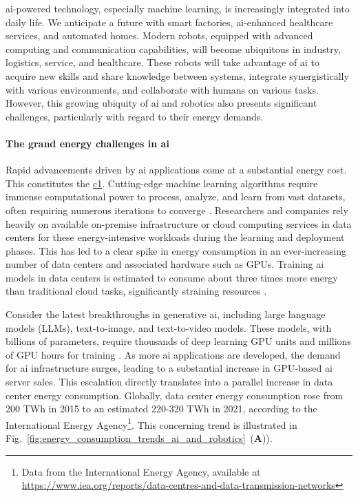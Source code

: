 \documentclass[12pt]{article}
\begin{document}
\Ac{ai}-powered technology, especially machine learning, is increasingly integrated into daily life. We anticipate a future with smart factories, \ac{ai}-enhanced healthcare services, and automated homes. Modern robots, equipped with advanced computing and communication capabilities, will become ubiquitous in industry, logistics, service, and healthcare. These robots will take advantage of \ac{ai} to acquire new skills and share knowledge between systems, integrate synergistically with various environments, and collaborate with humans on various tasks. However, this growing ubiquity of \ac{ai} and robotics also presents significant challenges, particularly with regard to their energy demands.

\paragraph*{The grand energy challenges in \ac{ai}}
Rapid advancements driven by \ac{ai} applications come at a substantial energy cost. This constitutes the \underline{\ac{c1}}. Cutting-edge machine learning algorithms require immense computational power to process, analyze, and learn from vast datasets, often requiring numerous iterations to converge \cite{Strubell2019EnergyPolicyConsiderations}. Researchers and companies rely heavily on available on-premise infrastructure or cloud computing services in data centers for these energy-intensive workloads during the learning and deployment phases. This has led to a clear spike in energy consumption in an ever-increasing number of data centers and associated hardware such as GPUs. Training \ac{ai} models in data centers is estimated to consume about three times more energy than traditional cloud tasks, significantly straining resources \cite{Thomas2023cloudusesmassive}.

Consider the latest breakthroughs in generative \ac{ai}, including large language models (LLMs), text-to-image, and text-to-video models. These models, with billions of parameters, require thousands of deep learning GPU units and millions of GPU hours for training \cite{Vanian2023ChatGPTgenerativeAI, Corbyn2023Nvidiachipmaker}. As more \ac{ai} applications are developed, the demand for \ac{ai} infrastructure surges, leading to a substantial increase in GPU-based \ac{ai} server sales. This escalation directly translates into a parallel increase in data center energy consumption. Globally, data center energy consumption rose from 200 TWh in 2015 to an estimated 220-320 TWh in 2021, according to the International Energy Agency\footnote{Data from the International Energy Agency, available at \url{https://www.iea.org/reports/data-centres-and-data-transmission-networks}}. This concerning trend is illustrated in Fig.~\ref{fig:energy_consumption_trends_ai_and_robotics}~(\textbf{A})).
\end{document}
